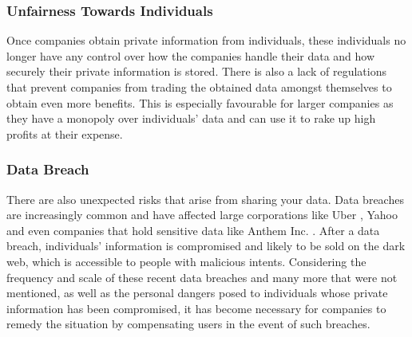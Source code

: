 \documentclass{icmmcm}
\begin{document}
\subsubsection*{Unfairness Towards Individuals}
Once companies obtain private information from individuals, these individuals no longer have any control over how the companies handle their data and how securely their private information is stored. There is also a lack of regulations that prevent companies from trading the obtained data amongst themselves to obtain even more benefits. This is especially favourable for larger companies as they have a monopoly over individuals' data and can use it to rake up high profits at their expense.

\subsubsection*{Data Breach}
There are also unexpected risks that arise from sharing your data. Data breaches are increasingly common and have affected large corporations like Uber \citep{uber_breach}, Yahoo \citep{yahoo_breach} and even companies that hold sensitive data like Anthem Inc. \citep{anthem_breach}. After a data breach, individuals' information is compromised and likely to be sold on the dark web, which is accessible to people with malicious intents. Considering the frequency and scale of these recent data breaches and many more that were not mentioned, as well as the personal dangers posed to individuals whose private information has been compromised, it has become necessary for companies to remedy the situation by compensating users in the event of such breaches.

\end{document}
